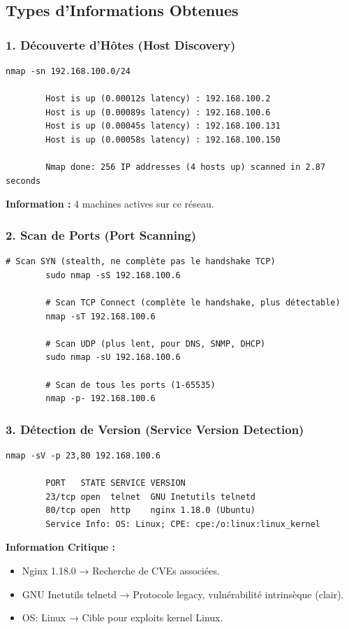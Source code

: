 \documentclass[12pt,a4paper,openany]{report}
\begin{document}
	\subsection{Types d'Informations Obtenues}
	
	\subsubsection{1. Découverte d'Hôtes (Host Discovery)}
	\begin{lstlisting}[caption=Ping scan pour identifier les machines actives]
		nmap -sn 192.168.100.0/24
		
		Host is up (0.00012s latency) : 192.168.100.2
		Host is up (0.00089s latency) : 192.168.100.6
		Host is up (0.00045s latency) : 192.168.100.131
		Host is up (0.00058s latency) : 192.168.100.150
		
		Nmap done: 256 IP addresses (4 hosts up) scanned in 2.87 seconds
	\end{lstlisting}
	\textbf{Information :} 4 machines actives sur ce réseau.
	
	\subsubsection{2. Scan de Ports (Port Scanning)}
	\begin{lstlisting}[caption=Types de scans de ports]
		# Scan SYN (stealth, ne complète pas le handshake TCP)
		sudo nmap -sS 192.168.100.6
		
		# Scan TCP Connect (complète le handshake, plus détectable)
		nmap -sT 192.168.100.6
		
		# Scan UDP (plus lent, pour DNS, SNMP, DHCP)
		sudo nmap -sU 192.168.100.6
		
		# Scan de tous les ports (1-65535)
		nmap -p- 192.168.100.6
	\end{lstlisting}
	
	\subsubsection{3. Détection de Version (Service Version Detection)}
	\begin{lstlisting}[caption=Identification des versions de services]
		nmap -sV -p 23,80 192.168.100.6
		
		PORT   STATE SERVICE VERSION
		23/tcp open  telnet  GNU Inetutils telnetd
		80/tcp open  http    nginx 1.18.0 (Ubuntu)
		Service Info: OS: Linux; CPE: cpe:/o:linux:linux_kernel
	\end{lstlisting}
	\textbf{Information Critique :}
	\begin{itemize}
		\item Nginx 1.18.0 → Recherche de CVEs associées.
		\item GNU Inetutils telnetd → Protocole legacy, vulnérabilité intrinsèque (clair).
		\item OS: Linux → Cible pour exploits kernel Linux.
	\end{itemize}
	
\end{document}
